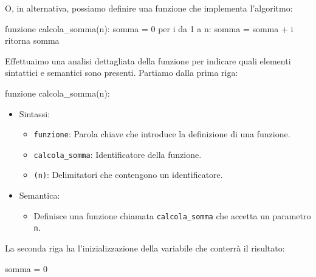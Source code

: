 \documentclass[
  letterpaper,
  DIV=11,
  numbers=noendperiod]{scrreprt}
\newenvironment{Shaded}{\begin{snugshade}}{\end{snugshade}}
\newcommand{\NormalTok}[1]{\textcolor[rgb]{0.00,0.23,0.31}{#1}}
\providecommand{\tightlist}{%
  \setlength{\itemsep}{0pt}\setlength{\parskip}{0pt}}\usepackage{longtable,booktabs,array}
\begin{document}
O, in alternativa, possiamo definire una funzione che implementa
l'algoritmo:

\begin{Shaded}
\begin{Highlighting}[]
\NormalTok{funzione calcola\_somma(n):}
\NormalTok{  somma = 0}
\NormalTok{  per i da 1 a n:}
\NormalTok{    somma = somma + i}
\NormalTok{  ritorna somma}
\end{Highlighting}
\end{Shaded}

Effettuaimo una analisi dettagliata della funzione per indicare quali
elementi sintattici e semantici sono presenti. Partiamo dalla prima
riga:

\begin{Shaded}
\begin{Highlighting}[]
\NormalTok{funzione calcola\_somma(n):}
\end{Highlighting}
\end{Shaded}

\begin{itemize}
\tightlist
\item
  Sintassi:

  \begin{itemize}
  \tightlist
  \item
    \texttt{funzione}: Parola chiave che introduce la definizione di una
    funzione.
  \item
    \texttt{calcola\_somma}: Identificatore della funzione.
  \item
    \texttt{(n)}: Delimitatori che contengono un identificatore.
  \end{itemize}
\item
  Semantica:

  \begin{itemize}
  \tightlist
  \item
    Definisce una funzione chiamata \texttt{calcola\_somma} che accetta
    un parametro \texttt{n}.
  \end{itemize}
\end{itemize}

La seconda riga ha l'inizializzazione della variabile che conterrà il
risultato:

\begin{Shaded}
\begin{Highlighting}[]
\NormalTok{somma = 0}
\end{Highlighting}
\end{Shaded}
\end{document}
